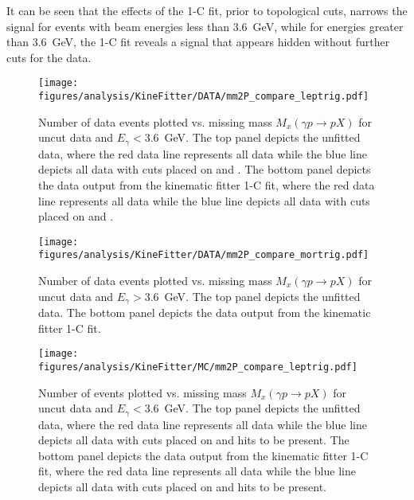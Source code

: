 It can be seen that the effects of the 1-C fit, prior to topological cuts, narrows the \piz signal for events with beam energies less than 3.6~GeV, while for energies greater than 3.6~GeV, the 1-C fit reveals a signal that appears hidden without further cuts for the data.
\begin{figure}[h!]\begin{center}
\texttt{[image: \\figures/analysis/KineFitter/DATA/mm2P\_compare\_leptrig.pdf]}
\caption[Number of data events plotted vs. missing mass $M_x(\gamma p \to p X)$ for uncut data and $E_\gamma < 3.6$~GeV]{\label{fig:kinfit.effect_lep}Number of data events plotted vs. missing mass $M_x(\gamma p \to p X)$ for uncut data and $E_\gamma < 3.6$~GeV. The top panel depicts the unfitted data, where the red data line represents all data while the blue line depicts all data with cuts placed on  and . The bottom panel depicts the data output from the kinematic fitter 1-C fit, where the red data line represents all data while the blue line depicts all data with cuts placed on  and .  }
\end{center}\end{figure}

\begin{figure}[h!]\begin{center}
\texttt{[image: \\figures/analysis/KineFitter/DATA/mm2P\_compare\_mortrig.pdf]}
\caption[Number of data events plotted vs. missing mass $M_x(\gamma p \to p X)$ for uncut data and $E_\gamma > 3.6$~GeV]{\label{fig:kinfit.effect_mor}Number of data events plotted vs. missing mass $M_x(\gamma p \to p X)$ for uncut data and $E_\gamma > 3.6$~GeV. The top panel depicts the unfitted data. The bottom panel depicts the data output from the kinematic fitter 1-C fit.}
\end{center}\end{figure}

\begin{figure}[h!]\begin{center}
\texttt{[image: \\figures/analysis/KineFitter/MC/mm2P\_compare\_leptrig.pdf]}
\caption[Number of  events plotted vs. missing mass $M_x(\gamma p \to p X)$ for uncut data and $E_\gamma < 3.6$~GeV]{\label{fig:kinfit.effect_lepMC}Number of  events plotted vs. missing mass $M_x(\gamma p \to p X)$ for uncut data and $E_\gamma < 3.6$~GeV. The top panel depicts the unfitted data, where the red data line represents all data while the blue line depicts all data with cuts placed on  and  hits to be present. The bottom panel depicts the data output from the kinematic fitter 1-C fit, where the red data line represents all data while the blue line depicts all data with cuts placed on  and  hits to be present.  }
\end{center}\end{figure}

